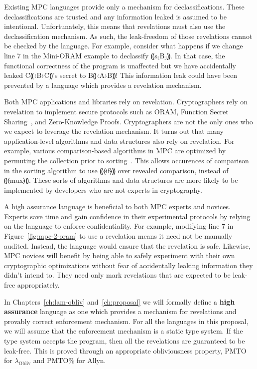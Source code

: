 \documentclass{report}
\newcommand{\lang}{Allyn\xspace}
\newcommand{\obliv}{\ensuremath{\lambda_{\mathrm{Obliv}}}\xspace}
\newcommand{\alice}{B⸨‹A›B⸩\xspace}
\newcommand{\bob}{C⸨‹B›C⸩\xspace}
\begin{document}
Existing MPC languages provide only a mechanism for declassifications. These declassifications are trusted and any
information leaked is assumed to be intentional. Unfortunately, this means that revelations must also use the
declassification mechanism. As such, the leak-freedom of those revelations cannot be checked
by the language. For example, consider what happens if we change line 7 in the Mini-ORAM example to declassify ⸨s⸤B⸥⸩.
In that case, the functional correctness of the program is unaffected but we have accidentally leaked \bob's secret to \alice!
This information leak could have been prevented by a language which provides a revelation mechanism.

Both MPC applications and libraries rely on revelation. Cryptographers rely on revelation to implement secure protocols such as ORAM,
Function Secret Sharing~\cite{}, and Zero-Knowledge Proofs\cite{}. Cryptographers are not the only ones who we expect to leverage the
revelation mechanism. It turns out that many application-level algorithms and data structures also rely on revelation. For example,
various comparison-based algorithms in MPC are optimized by permuting the collection prior to sorting~\cite{hamada2012}. This allows occurences of
comparison in the sorting algorithm to use ⸨⦑if⦒⸩ over revealed comparison, instead of ⸨⦑mux⦒⸩. These sorts of algorithms and
data structures are more likely to be implemented by developers who are not experts in cryptography.

A high assurance language is beneficial to both MPC experts and novices. Experts save time and gain confidence in their
experimental protocols by relying on the language to enforce confidentiality. For example, modifying line 7 in
Figure~\ref{fig:mpc-2-oram} to use a revelation means it need not be manually audited. Instead, the language would ensure that the
revelation is safe. Likewise, MPC novices will benefit by being able to safely experiment with their own cryptographic optimizations
without fear of accidentally leaking information they didn't intend to. They need only mark revelations that are expected to be
leak-free appropriately.

In Chapters~\ref{ch:lam-obliv} and~\ref{ch:proposal} we will formally define a \textbf{high assurance} language as one which provides
a mechanism for revelations and provably correct enforcement mechanism. For all the languages in this proposal, we will
assume that the enforcement mechanism is a static type system. If the type system accepts the program, then all the revelations
are guaranteed to be leak-free. This is proved through an appropriate obliviousness property, PMTO for \obliv and PMTO\% for \lang.
\end{document}
